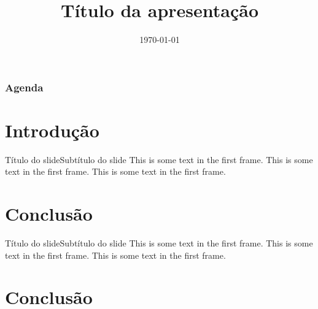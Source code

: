 \documentclass[xcolor=dvipsnames, aspectratio=169]{beamer}
\title[Título curto]{Título da apresentação}
\date{\today}
\begin{document}
\frame{\titlepage}

\begin{frame}
    \frametitle{Agenda}
    \tableofcontents
\end{frame}

\section{Introdução}

\begin{frame}{Título do slide}{Subtítulo do slide}
This is some text in the first frame. This is some text in the first frame. This is some text in the first frame.
\end{frame}

\section{Conclusão}


\begin{frame}{Título do slide}{Subtítulo do slide}
This is some text in the first frame. This is some text in the first frame. This is some text in the first frame.
\end{frame}

\section{Conclusão}

\frame{\titlepage}
\end{document}
